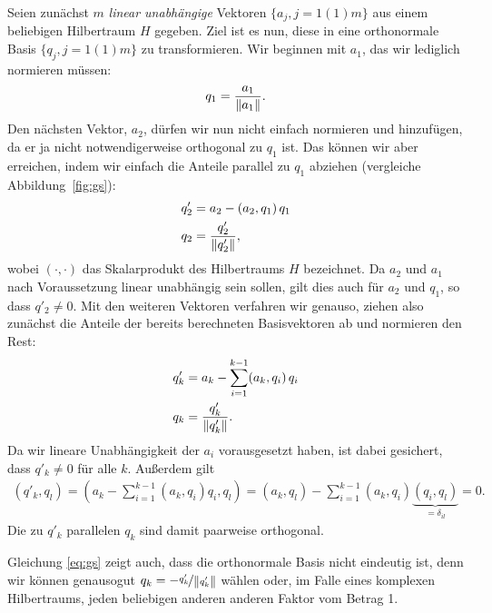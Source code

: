 Seien zunächst $m$ \emph{linear unabhängige} Vektoren $\{a_j,
j=1(1)m\}$ aus einem beliebigen Hilbertraum $H$ gegeben. Ziel ist es
nun, diese in eine orthonormale Basis $\{q_j, j=1(1)m \}$ zu
transformieren. Wir beginnen mit $a_1$, das wir lediglich normieren
müssen:
\begin{equation}
  q_1 = \frac{a_1}{\left\lVert{a_1}\right\rVert}.
\end{equation}
Den nächsten Vektor, $a_2$, dürfen wir nun nicht einfach normieren und
hinzufügen, da er ja nicht notwendigerweise orthogonal zu $q_1$
ist. Das können wir aber erreichen, indem wir einfach die Anteile
parallel zu $q_1$ abziehen (vergleiche Abbildung~\ref{fig:gs}):
\begin{align*}
  q'_2 &= a_2 - (a_2, q_1)\,q_1\\
  q_2 &= \frac{q'_2}{\left\lVert{q'_2}\right\rVert},
\end{align*}
wobei $(\cdot,\cdot)$ das Skalarprodukt des Hilbertraums $H$
bezeichnet.  Da $a_2$ und $a_1$ nach Voraussetzung linear unabhängig
sein sollen, gilt dies auch für $a_2$ und $q_1$, so dass $q'_2\neq
0$. Mit den weiteren Vektoren verfahren wir genauso, ziehen also
zunächst die Anteile der bereits berechneten Basisvektoren ab und
normieren den Rest:
\begin{align}
  \label{eq:gs}
  q'_k &= a_k - \sum_{i=1}^{k-1} (a_k, q_i)\,q_i\\
  q_k &= \frac{q'_k}{\left\lVert{q'_k}\right\rVert}.
\end{align}
Da wir lineare Unabhängigkeit der $a_i$ vorausgesetzt haben, ist dabei
gesichert, dass $q'_k\neq 0$ für alle $k$. Außerdem gilt
\begin{align}
  (q'_k,q_l) = \left(a_k - \sum_{i=1}^{k-1} (a_k, q_i) q_i, q_l\right) =
  (a_k, q_l) - \sum_{i=1}^{k-1} (a_k, q_i) \underbrace{(q_i,
    q_l)}_{=\delta_{il}} = 0.
\end{align}
Die zu $q'_k$ parallelen $q_k$ sind damit paarweise orthogonal.

Gleichung \eqref{eq:gs} zeigt auch, dass die orthonormale Basis nicht
eindeutig ist, denn wir können genausogut
$q_k=-\nicefrac{q'_k}{\left\lVert{q'_k}\right\rVert}$ wählen oder, im Falle eines
komplexen Hilbertraums, jeden beliebigen anderen anderen Faktor vom
Betrag 1.

